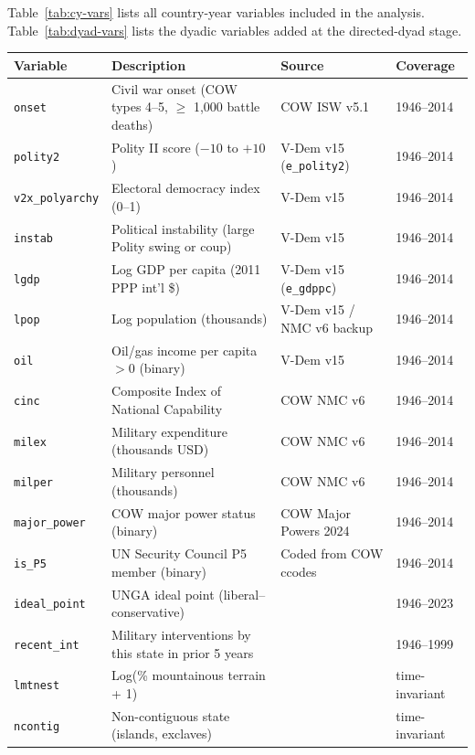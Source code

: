 Table~\ref{tab:cy-vars} lists all country-year variables included in the analysis.
Table~\ref{tab:dyad-vars} lists the dyadic variables added at the directed-dyad stage.

\begin{table}[p]
  \centering
  \scriptsize
  \begin{tabular}{@{}lp{5cm}ll@{}}
    \toprule
    \textbf{Variable} & \textbf{Description} & \textbf{Source} & \textbf{Coverage} \\
    \midrule
    \texttt{onset} & Civil war onset (COW types 4--5, $\geq$ 1,000 battle deaths) & COW ISW v5.1 & 1946--2014 \\
    \texttt{polity2} & Polity II score ($-10$ to $+10$) & V-Dem v15 (\texttt{e\_polity2}) & 1946--2014 \\
    \texttt{v2x\_polyarchy} & Electoral democracy index (0--1) & V-Dem v15 & 1946--2014 \\
    \texttt{instab} & Political instability (large Polity swing or coup) & V-Dem v15 & 1946--2014 \\
    \texttt{lgdp} & Log GDP per capita (2011 PPP int'l \$) & V-Dem v15 (\texttt{e\_gdppc}) & 1946--2014 \\
    \texttt{lpop} & Log population (thousands) & V-Dem v15 / NMC v6 backup & 1946--2014 \\
    \texttt{oil} & Oil/gas income per capita $>0$ (binary) & V-Dem v15 & 1946--2014 \\
    \texttt{cinc} & Composite Index of National Capability & COW NMC v6 & 1946--2014 \\
    \texttt{milex} & Military expenditure (thousands USD) & COW NMC v6 & 1946--2014 \\
    \texttt{milper} & Military personnel (thousands) & COW NMC v6 & 1946--2014 \\
    \texttt{major\_power} & COW major power status (binary) & COW Major Powers 2024 & 1946--2014 \\
    \texttt{is\_P5} & UN Security Council P5 member (binary) & Coded from COW ccodes & 1946--2014 \\
    \texttt{ideal\_point} & UNGA ideal point (liberal--conservative) & \citet{bailey2017} & 1946--2023 \\
    \texttt{recent\_int} & Military interventions by this state in prior 5 years & \citet{regan2000} & 1946--1999 \\
    \texttt{lmtnest} & Log(\% mountainous terrain + 1) & \citet{fearon2003} & time-invariant \\
    \texttt{ncontig} & Non-contiguous state (islands, exclaves) & \citet{fearon2003} & time-invariant \\

\end{tabular}
\end{table}
